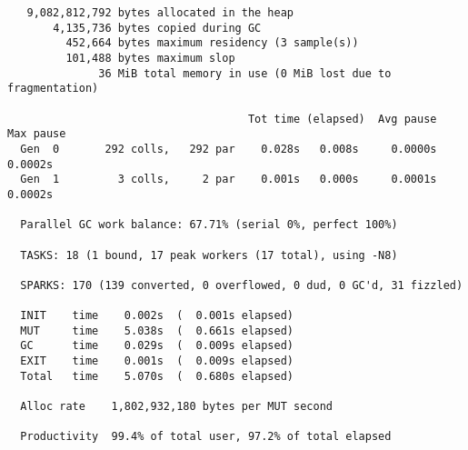 \begin{verbatim}
   9,082,812,792 bytes allocated in the heap
       4,135,736 bytes copied during GC
         452,664 bytes maximum residency (3 sample(s))
         101,488 bytes maximum slop
              36 MiB total memory in use (0 MiB lost due to fragmentation)

                                     Tot time (elapsed)  Avg pause  Max pause
  Gen  0       292 colls,   292 par    0.028s   0.008s     0.0000s    0.0002s
  Gen  1         3 colls,     2 par    0.001s   0.000s     0.0001s    0.0002s

  Parallel GC work balance: 67.71% (serial 0%, perfect 100%)

  TASKS: 18 (1 bound, 17 peak workers (17 total), using -N8)

  SPARKS: 170 (139 converted, 0 overflowed, 0 dud, 0 GC'd, 31 fizzled)

  INIT    time    0.002s  (  0.001s elapsed)
  MUT     time    5.038s  (  0.661s elapsed)
  GC      time    0.029s  (  0.009s elapsed)
  EXIT    time    0.001s  (  0.009s elapsed)
  Total   time    5.070s  (  0.680s elapsed)

  Alloc rate    1,802,932,180 bytes per MUT second

  Productivity  99.4% of total user, 97.2% of total elapsed
\end{verbatim}
